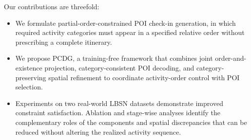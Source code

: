 Our contributions are threefold:
\begin{itemize}[leftmargin=1.2em,itemsep=2pt,topsep=2pt]
  \item We formulate partial-order-constrained POI check-in generation, in which required activity categories must appear in a specified relative order without prescribing a complete itinerary.
  \item We propose PCDG, a training-free framework that combines joint order-and-existence projection, category-consistent POI decoding, and category-preserving spatial refinement to coordinate activity-order control with POI selection.
  \item Experiments on two real-world LBSN datasets demonstrate improved constraint satisfaction. Ablation and stage-wise analyses identify the complementary roles of the components and spatial discrepancies that can be reduced without altering the realized activity sequence.
\end{itemize}
